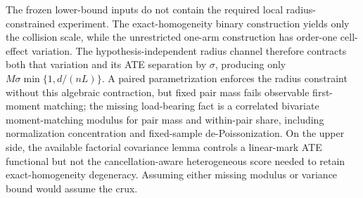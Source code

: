 The frozen lower-bound inputs do not contain the required local radius-constrained experiment.  The exact-homogeneity binary construction yields only the collision scale, while the unrestricted one-arm construction has order-one cell-effect variation.  The hypothesis-independent radius channel therefore contracts both that variation and its ATE separation by \(\sigma\), producing only \(M\sigma\min\{1,d/(nL)\}\).  A paired parametrization enforces the radius constraint without this algebraic contraction, but fixed pair mass fails observable first-moment matching; the missing load-bearing fact is a correlated bivariate moment-matching modulus for pair mass and within-pair share, including normalization concentration and fixed-sample de-Poissonization.  On the upper side, the available factorial covariance lemma controls a linear-mark ATE functional but not the cancellation-aware heterogeneous score needed to retain exact-homogeneity degeneracy.  Assuming either missing modulus or variance bound would assume the crux.